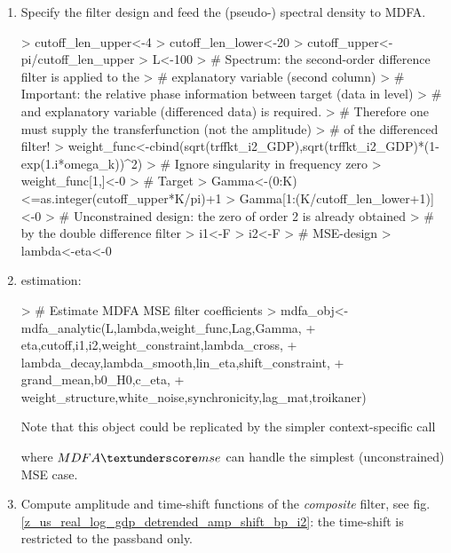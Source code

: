 \documentclass[a4paper]{book}
\begin{document}
\begin{enumerate}
\item Specify the filter design and feed the (pseudo-) spectral density to MDFA.
\begin{Schunk}
\begin{Sinput}
> cutoff_len_upper<-4
> cutoff_len_lower<-20
> cutoff_upper<-pi/cutoff_len_upper
> L<-100
> # Spectrum: the second-order difference filter is applied to the 
> # explanatory variable (second column) 
> #   Important: the relative phase information between target (data in level)
> #   and explanatory variable (differenced data) is required.
> #   Therefore one must supply the transferfunction (not the amplitude) 
> #   of the differenced filter!
> weight_func<-cbind(sqrt(trffkt_i2_GDP),sqrt(trffkt_i2_GDP)*(1-exp(1.i*omega_k))^2)
> # Ignore singularity in frequency zero
> weight_func[1,]<-0
> # Target
> Gamma<-(0:K)<=as.integer(cutoff_upper*K/pi)+1
> Gamma[1:(K/cutoff_len_lower+1)]<-0
> # Unconstrained design: the zero of order 2 is already obtained
> #   by the double difference filter
> i1<-F
> i2<-F
> # MSE-design
> lambda<-eta<-0
\end{Sinput}
\end{Schunk}
\item estimation:
\begin{Schunk}
\begin{Sinput}
> # Estimate MDFA MSE filter coefficients  
> mdfa_obj<-mdfa_analytic(L,lambda,weight_func,Lag,Gamma,
+               eta,cutoff,i1,i2,weight_constraint,lambda_cross,
+               lambda_decay,lambda_smooth,lin_eta,shift_constraint,
+               grand_mean,b0_H0,c_eta,
+               weight_structure,white_noise,synchronicity,lag_mat,troikaner)
\end{Sinput}
\end{Schunk}
Note that this object could be replicated by the simpler context-specific call
\begin{Schunk}
\end{Schunk}
where $MDFA\textunderscore mse$ can handle the simplest (unconstrained) MSE case.
\item Compute amplitude and time-shift functions of the \emph{composite} filter, see fig.\ref{z_us_real_log_gdp_detrended_amp_shift_bp_i2}: the time-shift is restricted to the passband only.

\end{enumerate}
\end{document}

